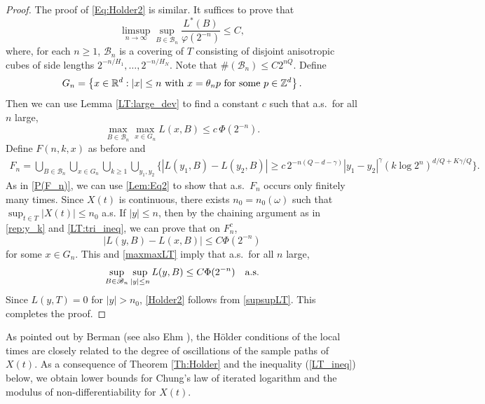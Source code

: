 \documentclass[11pt, reqno]{amsart}
\def\R{{\mathbb R}}
\def\Z{{\mathbb Z}}
\numberwithin{equation}{section}
\begin{document}
\begin{proof}
The proof of \eqref{Eq:Holder2} is similar. It suffices to prove that
\begin{equation}\label{Holder2}
\limsup_{n \to \infty} \sup_{B \in \mathscr{B}_n}\frac{L^*(B)}{\varphi(2^{-n})} \le C,
\end{equation}
where, for each $n \ge 1$, $\mathscr{B}_n$ is a covering of $T$ consisting of disjoint anisotropic cubes of side 
lengths $2^{-n/H_1}, \dots, 2^{-n/H_N}$. Note that $\#(\mathscr{B}_n) \le C 2^{nQ}$.
Define
\[ G_n = \left\{ x \in \R^d : |x| \le  n \textup{ with } x = \theta_n p \textup{ for some } p \in \Z^d \right\}. \]
Then we can use Lemma \ref{LT:large_dev} to find a constant $c$ such that a.s.~for all $n$ large, 
\begin{equation}\label{maxmaxLT}
\max_{B \in \mathscr{B}_n} \max_{x \in G_n} L(x, B) \le c\, \Phi(2^{-n}).
\end{equation}
Define $F(n,k,x)$ as before and 
\begin{align*}
F_n = \bigcup_{B \in \mathscr{B}_n} \bigcup_{x \in G_n} \bigcup_{k \ge 1} \bigcup_{y_1, y_2} \Big\{ |L(y_1, B) - L(y_2, B)|
\ge c\, 2^{-n(Q-d-\gamma)} |y_1 - y_2|^{\gamma} (k\log 2^n)^{d/Q + K\gamma/Q} \Big\}.
\end{align*}
As in \eqref{P(F_n)}, we can use \eqref{Lem:Eq2} to show that a.s.~$F_n$ occurs only finitely many times. 
Since $X(t)$ is continuous, there exists $n_0 = n_0(\omega)$ such that
$\sup_{t \in T} |X(t)| \le n_0$ a.s.
If $|y| \le n$, then by the chaining argument as in \eqref{rep:y_k} and \eqref{LT:tri_ineq}, we can prove that on $F_n^c$,
\[ |L(y, B) - L(x, B)| \le C \Phi(2^{-n}) \]
for some $x \in G_n$.
This and \eqref{maxmaxLT} imply that a.s.~for all $n$ large,
\begin{equation}\label{supsupLT}
\sup_{B \in \mathscr{B}_n} \sup_{|y| \le n} L(y, B) \le C \Phi(2^{-n}) \quad \textup{a.s.}
\end{equation}
Since $L(y, T) = 0$ for $|y| > n_0$, \eqref{Holder2} follows from \eqref{supsupLT}. This completes the proof.
\end{proof}

As pointed out by Berman \cite{B73} (see also Ehm \cite{E81}), the H\"older conditions of the local times are 
closely related to the degree of oscillations of the sample paths of $X(t)$. As a consequence of Theorem \ref{Th:Holder} 
and the inequality (\ref{LT_ineq}) below, we obtain lower bounds for Chung's law of iterated logarithm and the 
modulus of non-differentiability for $X(t)$. 
\end{document}
